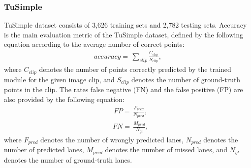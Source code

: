 \documentclass[journal]{IEEEtran}
\begin{document}
\subsubsection{TuSimple}
TuSimple dataset consists of 3,626 training sets and 2,782 testing sets. Accuracy is the main evaluation metric of the TuSimple dataset, defined by the following equation according to the average number of correct points:
\begin{equation}
    \begin{aligned}
        accuracy = \,  \sum_{clip}{\frac{C_{clip}}{S_{clip}}} ,
    \end{aligned}
\end{equation}
where $C_{clip}$ denotes the number of points correctly predicted by the trained module for the given image clip, and $S_{clip}$ denotes the number of ground-truth points in the clip. The rates false negative (FN) and the false positive (FP) are also provided by the following equation:
\begin{equation}
    \begin{aligned}
        &FP = \, \frac{F_{pred}}{N_{pred}} ,
    \end{aligned}
\end{equation}
\begin{equation}
    \begin{aligned}
        &FN = \, \frac{M_{pred}}{N_{gt}}  ,  
    \end{aligned}
\end{equation}
where $F_{pred}$ denotes the number of wrongly predicted lanes, $N_{pred}$ denotes the number of predicted lanes, $M_{pred}$ denotes the number of missed lanes, and $N_{gt}$ denotes the number of ground-truth lanes.
\end{document}
